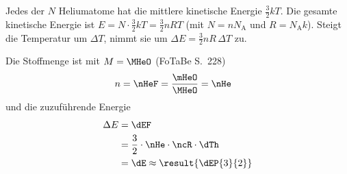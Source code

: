 Jedes der $N$ Heliumatome hat die mittlere kinetische Energie $\frac{3}{2}kT$. Die gesamte kinetische Energie ist $E = N\cdot\frac{3}{2}kT = \frac{3}{2}nRT$ (mit $N = nN_\text{A}$ und $R = N_\text{A}k$). Steigt die Temperatur um $\Delta T$, nimmt sie um $\Delta E = \frac{3}{2}nR\,\Delta T$ zu.

Die Stoffmenge ist mit $M = \MHeO$ (FoTaBe S.~228)
\begin{align}
 n &= \nHeF = \frac{\mHeO}{\MHeO} = \nHe
\end{align}
und die zuzuführende Energie
\begin{align}
 \Delta E &= \dEF \\
   &= \frac{3}{2}\cdot\nHe\cdot\ncR\cdot\dTh \\
   &= \dE \approx \result{\dEP{3}{2}}
\end{align}
